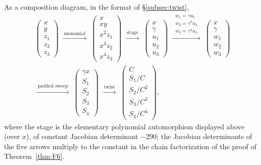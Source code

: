 \documentclass[11pt]{article}
\numberwithin{equation}{section}
\theoremstyle{plain}
\theoremstyle{definition}
\theoremstyle{remark}
\begin{document}
As a composition diagram, in the format of \S\ref{subsec:twist},
\begin{multline*}
\begin{pmatrix}x\\ y\\ z_1\\ z_2\\ z_3\end{pmatrix}
\;\xrightarrow{\ \text{monomial}\ }\;
\begin{pmatrix}x\\ xy\\ x^2z_1\\ x^3z_2\\ x^4z_3\end{pmatrix}
\;\xrightarrow{\ \text{stage}\ }\;
\begin{pmatrix}x\\ \gamma\\ u_1\\ u_2\\ u_3\end{pmatrix}
\;\xrightarrow{\ \substack{w_1=\gamma u_1\\[1pt] w_2=\gamma^3u_2\\[1pt] w_3=\gamma^4u_3}\ }\;
\begin{pmatrix}x\\ \gamma\\ w_1\\ w_2\\ w_3\end{pmatrix}\\
\xrightarrow{\ \text{padded sweep}\ }\;
\begin{pmatrix}\gamma x\\ S_1\\ S_2\\ S_3\\ S_4\end{pmatrix}
\;\xrightarrow{\ \text{twist}\ }\;
\begin{pmatrix}C\\ S_1/C\\ S_2/C^2\\ S_3/C^3\\ S_4/C^4\end{pmatrix},
\end{multline*}
where the stage is the elementary polynomial automorphism displayed above
(over $x$), of constant Jacobian determinant $-290$; the Jacobian determinants
of the five arrows multiply to the constant in the chain factorization of the
proof of Theorem~\ref{thm:F6}.
\end{document}
